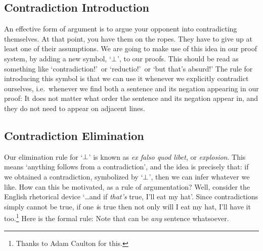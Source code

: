 \subsection{Contradiction Introduction}
An effective form of argument is to argue your opponent into contradicting themselves. At that point, you have them on the ropes. They have to give up at least one of their assumptions. We are going to make use of this idea in our proof system, by adding a new symbol, `$\bot$', to our proofs. This should be read as something like `contradiction!'\ or `reductio!'\ or `but that's absurd!'  The rule for introducing this symbol is that we can use it whenever we explicitly contradict ourselves, i.e.\ whenever we find both a sentence and its negation appearing in our proof:
It does not matter what order the sentence and its negation appear in, and they do not need to appear on adjacent lines. 


\subsection{Contradiction Elimination}
Our elimination rule for `$\bot$' is known as \emph{ex falso quod libet}, or \emph{explosion}. This means `anything follows from a contradiction', and the idea is precisely that: if we obtained a contradiction, symbolized by `$\bot$', then we can infer whatever we like. How can this be motivated, as a rule of argumentation? Well, consider the English rhetorical device `\ldots and if \emph{that's} true, I'll eat my hat'. Since contradictions simply cannot be true, if one \emph{i}s true then not only will I eat my hat, I'll have it too.\footnote{Thanks to Adam Caulton for this.} Here is the formal rule:
Note that \metaX can be \emph{any} sentence whatsoever. 

